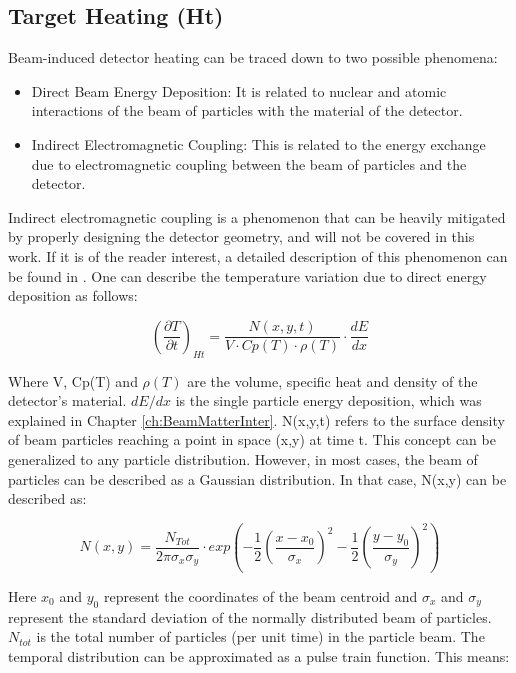 \subsection{Target Heating (Ht)}

Beam-induced detector heating can be traced down to two possible phenomena: 

\begin{itemize}
    \item Direct Beam Energy Deposition: It is related to nuclear and atomic interactions of the beam of particles with the material of the detector. 
    \item Indirect Electromagnetic Coupling: This is related to the energy exchange due to electromagnetic coupling between the beam of particles and the detector. 
\end{itemize}

Indirect electromagnetic coupling is a phenomenon that can be heavily mitigated by properly designing the detector geometry, and will not be covered in this work. If it is of the reader interest, a detailed description of this phenomenon can be found in \parencite[][]{ref:ElectroHeating}. One can describe the temperature variation due to direct energy deposition as follows: 

\begin{equation}
    \left(\frac{\partial T}{\partial t}\right)_{Ht} = \frac{N (x,y,t)}{V\cdot Cp(T)\cdot \rho (T)}\cdot \frac{dE}{dx}
\end{equation}

Where V, Cp(T) and $\rho (T)$ are the volume, specific heat and density of the detector's material. $dE/dx$ is the single particle energy deposition, which was explained in Chapter \ref{ch:BeamMatterInter}. N(x,y,t) refers to the surface density of beam particles reaching a point in space (x,y) at time t. This concept can be generalized to any particle distribution. However, in most cases, the beam of particles can be described as a Gaussian distribution. In that case, N(x,y) can be described as: 

\begin{equation}
    N(x,y) = \frac{N_{Tot}}{2 \pi \sigma_x \sigma_y}\cdot exp \left(
              -\frac{1}{2}\left(\frac{x-x_0}{\sigma_x}\right)^2 - \frac{1}{2}\left(\frac{y - y_0}{\sigma_y}\right)^2\right)
\end{equation}

Here $x_0$ and $y_0$ represent the coordinates of the beam centroid and $\sigma_x$ and $\sigma_y$ represent the standard deviation of the normally distributed beam of particles. $N_{tot}$ is the total number of particles (per unit time) in the particle beam. The temporal distribution can be approximated as a pulse train function. This means: 

